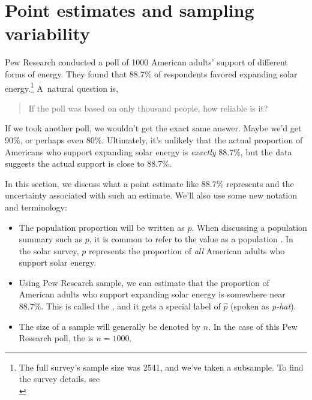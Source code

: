 \section{Point estimates and sampling variability}
\label{pointEstimates}


\newcommand{\pewsolarpollsize}{1000}
\newcommand{\pewsolarpollprop}{0.887}
\newcommand{\pewsolarpollpropcomplement}{0.113}
\newcommand{\pewsolarpollpercent}{88.7}
\newcommand{\pewsolarpollpercentcomplement}{11.3}
\newcommand{\pewsolarpollcount}{887}
\newcommand{\pewsolarpollcountcomplement}{113}
\newcommand{\pewsolarpollse}{0.0100}

Pew Research conducted a poll of 1000
American adults' support of different forms of energy.
They found that \pewsolarpollpercent{}\% of respondents
favored expanding
solar energy.\footnote{The full survey's sample size was 2541,
and we've taken a subsample. To find the survey details, see\\
}
A~natural question is,
\begin{quote}
If the poll was based on only thousand people, how reliable is it?
\end{quote}
If we took another poll, we wouldn't get the exact same answer.
Maybe we'd get 90\%, or perhaps even 80\%.
Ultimately, it's unlikely that the actual proportion of Americans
who support expanding solar energy is \emph{exactly}
\pewsolarpollpercent{}\%, but the data suggests the actual
support is close to \pewsolarpollpercent{}\%.

In this section, we discuss what a point estimate like
\pewsolarpollpercent{}\% represents
and the uncertainty associated with such an estimate. We'll also
use some new notation and terminology:
\begin{itemize}
\item The population proportion will be written as $p$.
    When discussing a population summary such as $p$,
    it is common to refer to the value as a population
    .
    In the solar survey,
    $p$ represents the proportion of \emph{all}
    American adults who support solar energy.
\item Using Pew Research sample, we can estimate that the proportion
    of American adults who support expanding solar energy is
    somewhere near \pewsolarpollpercent{}\%.
    This is called the ,
    and it gets a special label of $\hat{p}$
    (spoken as \emph{p-hat}).
\item The size of a sample will generally
    be denoted by $n$. In the case of this Pew Research poll,
    the  is $n = \pewsolarpollsize{}$.
\end{itemize}

